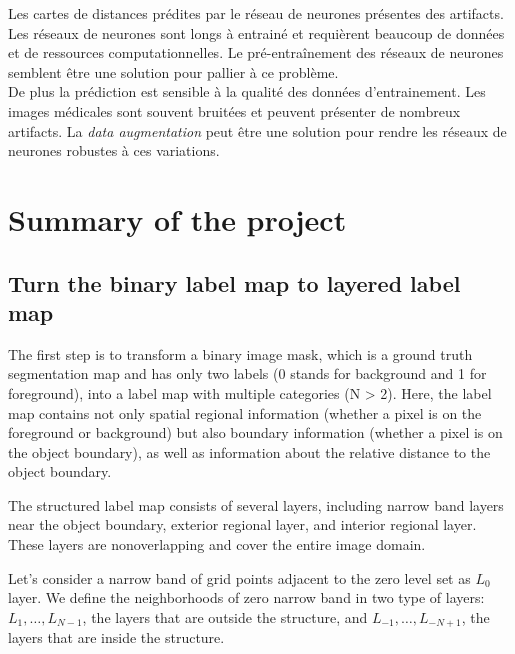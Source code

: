 \documentclass[a4paper, 11pt]{article}
\begin{document}
Les cartes de distances prédites par le réseau de neurones présentes des artifacts. Les réseaux de neurones sont longs à entrainé et requièrent beaucoup de données et de ressources computationnelles. Le pré-entraînement des réseaux de neurones semblent être une solution pour pallier à ce problème. \\ 
De plus la prédiction est sensible à la qualité des données d'entrainement. Les images médicales sont souvent bruitées et peuvent présenter de nombreux artifacts. La \textit{data augmentation} peut être une solution pour rendre les réseaux de neurones robustes à ces variations.

\section{Summary of the project}

\subsection{Turn the binary label map to layered label map}
The first step is to transform a binary image mask, which is a ground truth segmentation map and has only two labels (0 stands for background and 1 for foreground), into a label map with multiple categories (N > 2). Here, the label map contains not only spatial regional information (whether a pixel is on the foreground or background) but also boundary information (whether a pixel is on the object boundary), as well as information about the relative distance to the object boundary.

The structured label map consists of several layers, including narrow band layers near the object boundary, exterior regional layer, and interior regional layer. These layers are nonoverlapping and cover the entire image domain.

Let's consider a narrow band of grid points adjacent to the zero level set as $L_0$ layer. We define the neighborhoods of zero narrow band in two type of layers: $L_1, \dots, L_{N-1}$, the layers that are outside the structure, and $L_{-1}, \dots, L_{-N+1}$, the layers that are inside the structure.
\end{document}
